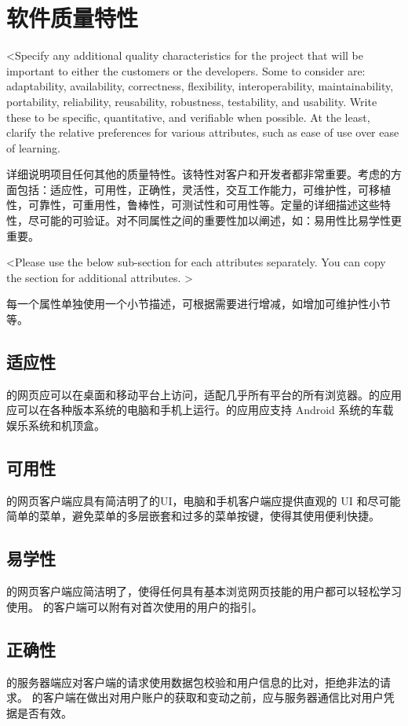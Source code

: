 \chapter{软件质量特性}
<Specify any additional quality characteristics for the project that will be important to either the customers or the developers. Some to consider are: adaptability, availability, correctness, flexibility, interoperability, maintainability, portability, reliability, reusability, robustness, testability, and usability. Write these to be specific, quantitative, and verifiable when possible. At the least, clarify the relative preferences for various attributes, such as ease of use over ease of learning.

详细说明项目任何其他的质量特性。该特性对客户和开发者都非常重要。考虑的方面包括：适应性，可用性，正确性，灵活性，交互工作能力，可维护性，可移植性，可靠性，可重用性，鲁棒性，可测试性和可用性等。定量的详细描述这些特性，尽可能的可验证。对不同属性之间的重要性加以阐述，如：易用性比易学性更重要。

<Please use the below sub-section for each attributes separately. You can copy the section for additional attributes. >

每一个属性单独使用一个小节描述，可根据需要进行增减，如增加可维护性小节等。

\section {适应性}
\proname 的网页应可以在桌面和移动平台上访问，适配几乎所有平台的所有浏览器。\proname 的应用应可以在各种版本系统的电脑和手机上运行。\proname 的应用应支持 Android 系统的车载娱乐系统和机顶盒。

\section {可用性}
\proname 的网页客户端应具有简洁明了的UI，电脑和手机客户端应提供直观的 UI 和尽可能简单的菜单，避免菜单的多层嵌套和过多的菜单按键，使得其使用便利快捷。

\section {易学性}
\proname 的网页客户端应简洁明了，使得任何具有基本浏览网页技能的用户都可以轻松学习使用。 \proname 的客户端可以附有对首次使用的用户的指引。

\section {正确性}
\proname 的服务器端应对客户端的请求使用数据包校验和用户信息的比对，拒绝非法的请求。
\proname 的客户端在做出对用户账户的获取和变动之前，应与服务器通信比对用户凭据是否有效。

